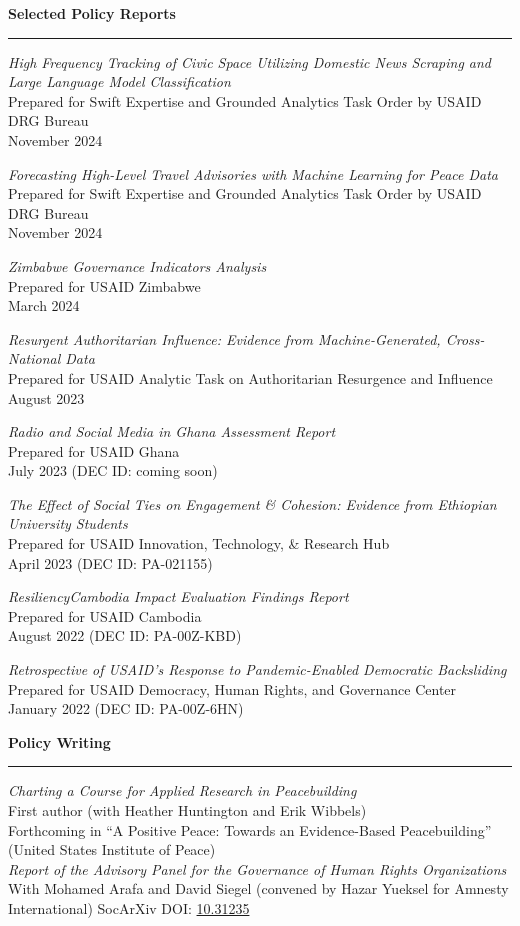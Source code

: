 \documentclass[11pt]{article}
\begin{document}
\textbf{\large Selected Policy Reports}\\
\rule[3mm]{\textwidth}{.2pt}


{\sl High Frequency Tracking of Civic Space Utilizing Domestic News Scraping and Large Language Model Classification}\\
Prepared for Swift Expertise and Grounded Analytics Task Order by USAID DRG Bureau\\
November 2024

{\sl Forecasting High-Level Travel Advisories with Machine Learning for Peace Data}\\
Prepared for Swift Expertise and Grounded Analytics Task Order by USAID DRG Bureau\\
November 2024

{\sl Zimbabwe Governance Indicators Analysis}\\
Prepared for USAID Zimbabwe\\
March 2024

{\sl Resurgent Authoritarian Influence: Evidence from Machine-Generated, Cross-National Data}\\
Prepared for USAID Analytic Task on Authoritarian Resurgence and Influence\\
August 2023

{\sl Radio and Social Media in Ghana Assessment Report}\\
Prepared for USAID Ghana\\
July 2023 (DEC ID: coming soon)

{\sl The Effect of Social Ties on Engagement \& Cohesion: Evidence from Ethiopian University Students}\\
Prepared for USAID Innovation, Technology, \& Research Hub\\
April 2023 (DEC ID: PA-021155)

{\sl ResiliencyCambodia Impact Evaluation Findings Report}\\
Prepared for USAID Cambodia\\
August 2022 (DEC ID: PA-00Z-KBD)

{\sl  Retrospective of USAID’s Response to Pandemic-Enabled Democratic Backsliding}\\
Prepared for USAID Democracy, Human Rights, and Governance Center\\
January 2022 (DEC ID: PA-00Z-6HN)

\textbf{\large Policy Writing}\\
\rule[3mm]{\textwidth}{.2pt}
{\sl Charting a Course for Applied Research in Peacebuilding}\\
First author (with Heather Huntington and Erik Wibbels)\\
Forthcoming in ``A Positive Peace: Towards an Evidence-Based Peacebuilding'' (United States Institute of Peace)\\
{\sl Report of the Advisory Panel for the Governance of Human Rights Organizations}\\
With Mohamed Arafa and David Siegel (convened by Hazar Yueksel for Amnesty International) SocArXiv DOI: \href{https://doi.org/10.31235/osf.io/7devb}{10.31235}\\
\end{document}
